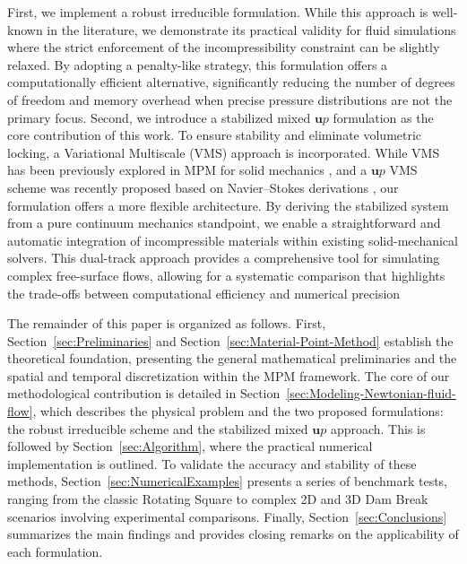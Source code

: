 \documentclass[11pt,english]{article}
\def\up{$\boldsymbol{u}p$\xspace}
\begin{document}
    First, we implement a robust irreducible formulation. While this approach is well-known in the literature, we demonstrate its practical validity for  fluid simulations where the strict enforcement of the incompressibility constraint can be slightly relaxed. By adopting a penalty-like strategy, this formulation offers a computationally efficient alternative, significantly reducing the number of degrees of freedom and memory overhead when precise pressure distributions are not the primary focus. Second, we introduce a stabilized mixed \up formulation as the core contribution of this work. To ensure stability and eliminate volumetric locking, a Variational Multiscale (VMS) approach is incorporated. While VMS has been previously explored in MPM for solid mechanics \cite{moreno2025mixed}, and a \up VMS scheme was recently proposed based on Navier–Stokes derivations \cite{chandra2024stabilized}, our formulation offers a more flexible architecture. By deriving the stabilized system from a pure continuum mechanics standpoint, we enable a straightforward and automatic integration of incompressible materials within existing solid-mechanical solvers. This dual-track approach provides a comprehensive tool for simulating complex free-surface flows, allowing for a systematic comparison that highlights the trade-offs between computational efficiency and numerical precision

    The remainder of this paper is organized as follows. First, Section~\ref{sec:Preliminaries} and Section~\ref{sec:Material-Point-Method} establish the theoretical foundation, presenting the general mathematical preliminaries and the spatial and temporal discretization within the MPM framework. The core of our methodological contribution is detailed in Section~\ref{sec:Modeling-Newtonian-fluid-flow}, which describes the physical problem and the two proposed formulations: the robust irreducible scheme and the stabilized mixed \up approach. This is followed by Section~\ref{sec:Algorithm}, where the practical numerical implementation is outlined. To validate the accuracy and stability of these methods, Section~\ref{sec:NumericalExamples} presents a series of benchmark tests, ranging from the classic Rotating Square to complex 2D and 3D Dam Break scenarios involving experimental comparisons. Finally, Section~\ref{sec:Conclusions} summarizes the main findings and provides closing remarks on the applicability of each formulation.


%
%
\end{document}
